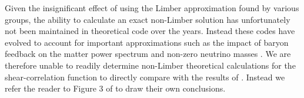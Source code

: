 Given the insignificant effect of using the Limber approximation found by various groups, the ability to calculate an exact non-Limber solution has unfortunately not been maintained in theoretical code over the years.  Instead these codes have evolved to account for important approximations such as the impact of baryon feedback on the matter power spectrum and non-zero neutrino masses \citep[see for example][]{joudaki/etal:2016, mead/etal:2016}.    We are therefore unable to readily determine non-Limber theoretical calculations for the shear-correlation function to directly compare with the results of \citet{kitching/etal:2016}.   Instead we refer the reader to Figure 3 of \citet{giannantonio/etal:2012} to draw their own conclusions.



 
 
 
 
 
 
 